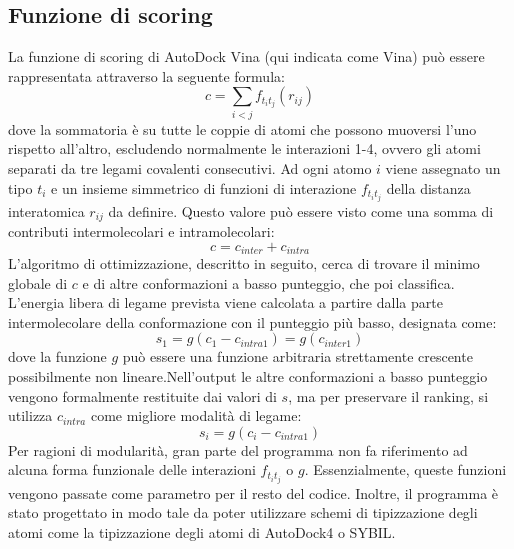 \subsection{Funzione di scoring}
\def\baselinestretch{1.66}
\noindent La funzione di scoring di AutoDock Vina (qui indicata come Vina) può essere rappresentata attraverso la seguente formula:\newline
\begin{equation}
    c = \sum_{i<j}f_{t_it_j}(r_{ij})
\end{equation} \newline
dove la sommatoria è su tutte le coppie di atomi che possono muoversi l'uno rispetto all'altro, escludendo normalmente le interazioni 1-4, ovvero gli atomi separati da tre legami covalenti consecutivi. Ad ogni atomo $i$ viene assegnato un tipo $t_i$ e un insieme simmetrico di funzioni di interazione $f_{t_it_j}$ della distanza interatomica $r_{ij}$ da definire.\newline
Questo valore può essere visto come una somma di contributi intermolecolari e intramolecolari:\newline
\begin{equation}
    c = c_{inter} + c_{intra}
\end{equation}\newline
L'algoritmo di ottimizzazione, descritto in seguito, cerca di trovare il minimo globale di $c$ e di altre conformazioni a basso punteggio, che poi classifica.\newline 
L'energia libera di legame prevista viene calcolata a partire dalla parte intermolecolare della conformazione con il punteggio più basso, designata come:\newline
\begin{equation}
    s_1 = g(c_1 - c_{intra1}) = g(c_{inter1})
\end{equation}\newline
dove la funzione $g$ può essere una funzione arbitraria strettamente crescente possibilmente non lineare.\newline Nell'output le altre conformazioni a basso punteggio vengono formalmente restituite dai valori di $s$, ma per preservare il ranking, si utilizza $c_{intra}$ come migliore modalità di legame:\newline
\begin{equation}
    s_i = g(c_i - c_{intra1})
\end{equation}\newline
Per ragioni di modularità, gran parte del programma non fa riferimento ad alcuna forma funzionale delle interazioni $f_{t_it_j}$ o $g$. Essenzialmente, queste funzioni vengono passate come parametro per il resto del codice. Inoltre, il programma è stato progettato in modo tale da poter utilizzare schemi di tipizzazione degli atomi come la tipizzazione degli atomi di AutoDock4 o SYBIL.\newline
